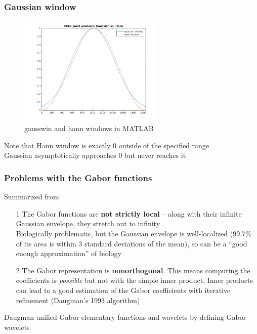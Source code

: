 \documentclass{beamer}
\begin{document}

\begin{frame}
	\frametitle{Gaussian window}
	\begin{figure}
		\centering
		\includegraphics[width=7cm]{./gaussianvshann.png}
		\caption{gausswin and hann windows in MATLAB}
	\end{figure}
	Note that Hann window is exactly 0 outside of the specified range\\
	Gaussian asymptotically approaches 0 but never reaches it
\end{frame}

\begin{frame}
	\frametitle{Problems with the Gabor functions}
	Summarized from \cite{gabor2}
	\begin{enumerate}
		\item[1]
			The Gabor functions are \textbf{not strictly local} -- along with their infinite Gaussian envelope, they stretch out to infinity\\
			Biologically problematic, but the Gaussian envelope is well-localized (99.7\% of its area is within 3 standard deviations of the mean), so can be a ``good enough approximation'' of biology
		\item[2]
			The Gabor representation is \textbf{nonorthogonal}. This means computing the coefficients is \textit{possible} but not with the simple inner product. Inner products can lead to a good estimation of the Gabor coefficients with iterative refinement (Daugman's 1993 algorithm)
	\end{enumerate}
	Daugman unified Gabor elementary functions and wavelets by defining Gabor wavelets
\end{frame}
\end{document}
